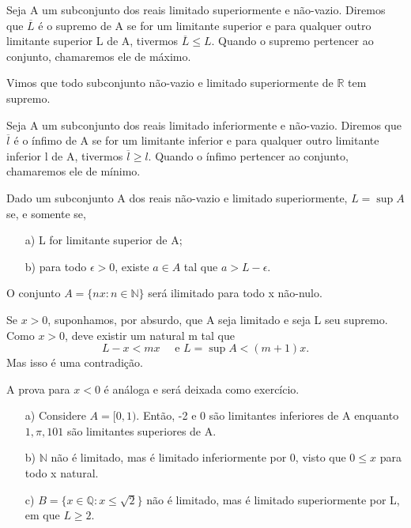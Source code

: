 \documentclass[analysis_notes.tex]{subfiles}
\begin{document}
\begin{def*}
	Seja A um subconjunto dos reais limitado superiormente e n\~ao-vazio. Diremos que $\overline{L}$ \'e o supremo de A se for um limitante superior
	e para qualquer outro limitante superior L de A, tivermos $\overline{L}\leq L$. Quando o supremo pertencer ao conjunto, chamaremos ele de m\'aximo.
\end{def*}
Vimos que todo subconjunto n\~ao-vazio e limitado superiormente de $\mathbb{R}$ tem supremo.
\begin{def*}
	Seja A um subconjunto dos reais limitado inferiormente e n\~ao-vazio. Diremos que $\overline{l}$ \'e o \'infimo de A se for um limitante inferior
	e para qualquer outro limitante inferior l de A, tivermos $\overline{l}\geq l$. Quando o \'infimo pertencer ao conjunto, chamaremos ele de m\'inimo.
\end{def*}
\begin{prop*}
	Dado um subconjunto A dos reais n\~ao-vazio e limitado superiormente, $L = \sup{A}$ se, e somente se,
	\begin{itemize}
		\item[a)] L for limitante superior de A;
		\item[b)] para todo $\epsilon > 0$, existe $a\in A$ tal que $a > L - \epsilon.$
	\end{itemize}
\end{prop*}
\begin{theorem*}
	O conjunto $A=\{nx: n\in\mathbb{N}\}$ ser\'a ilimitado para todo x n\~ao-nulo.
\end{theorem*}
\begin{proof*}
	Se $x > 0$, suponhamos, por absurdo, que A seja limitado e seja L seu supremo. Como $x > 0$, deve existir um natural m tal que
	$$
		L - x < mx \quad\text{ e } L = \sup{A} < (m+1)x.
	$$
	Mas isso \'e uma contradi\c c\~ao.

	A prova para $x < 0$ \'e an\'aloga e ser\'a deixada como exerc\'icio. \qedsymbol
\end{proof*}
\begin{example}
	\begin{itemize}
		\item[a)] Considere $A = [0, 1).$ Ent\~ao, -2 e 0 s\~ao limitantes inferiores de A enquanto $1, \pi, 101$ s\~ao limitantes
		      superiores de A.
		\item[b)] $\mathbb{N}$ n\~ao \'e limitado, mas \'e limitado inferiormente por 0, visto que $0\leq{x}$ para todo x natural.
		\item[c)] $B=\{x\in \mathbb{Q}: x\leq{\sqrt{2}}\}$ n\~ao \'e limitado, mas \'e limitado superiormente por L, em que $L\geq{2}.$ \qedsymbol
	\end{itemize}
\end{example}
\end{document}
